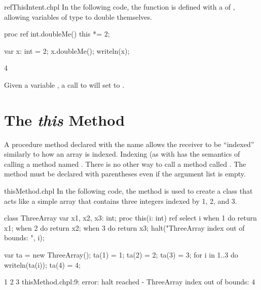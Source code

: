 \begin{chapelexample}{refThisIntent.chpl}
In the following code, the  function is defined with a
 of , allowing variables of type  to
double themselves.
\begin{chapel}
proc ref int.doubleMe() { this *= 2; }
\end{chapel}
\begin{chapelpost}
var x: int = 2;
x.doubleMe();
writeln(x);
\end{chapelpost}
\begin{chapeloutput}
4
\end{chapeloutput}
Given a variable , a call to  will set 
to .
\end{chapelexample}

\section{The {\em this} Method}
\label{The_this_Method}

A procedure method declared with the name  allows the receiver to be
``indexed'' similarly to how an array is indexed.  Indexing (as with
 has the semantics of calling a method
named .  There is no other way to call a method
called .  The  method must be declared with
parentheses even if the argument list is empty.

\begin{chapelexample}{thisMethod.chpl}
In the following code, the  method is used to create a
class that acts like a simple array that contains three integers
indexed by 1, 2, and 3.
\begin{chapel}
class ThreeArray {
  var x1, x2, x3: int;
  proc this(i: int) ref {
    select i {
      when 1 do return x1;
      when 2 do return x2;
      when 3 do return x3;
    }
    halt("ThreeArray index out of bounds: ", i);
  }
}
\end{chapel}
\begin{chapelpost}
var ta = new ThreeArray();
ta(1) = 1;
ta(2) = 2;
ta(3) = 3;
for i in 1..3 do
  writeln(ta(i));
ta(4) = 4;
\end{chapelpost}
\begin{chapeloutput}
1
2
3
thisMethod.chpl:9: error: halt reached - ThreeArray index out of bounds: 4
\end{chapeloutput}
\end{chapelexample}

